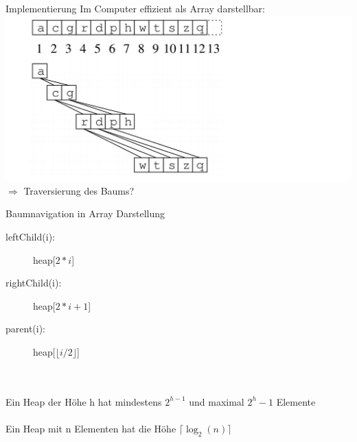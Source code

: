 \begin{frame}{Implementierung}
	Im Computer effizient als Array darstellbar: \\
	\includegraphics[scale=0.2]{images/heapArray.png} \\
	$\Rightarrow$ Traversierung des Baums?
\end{frame}

\begin{frame}{Baumnavigation in Array Darstellung}
	\begin{description}
		\item[leftChild(i):] heap[$2*i$]
		\item[rightChild(i):] heap[$2*i + 1$]
		\item[parent(i):] heap[$\lfloor i / 2 \rfloor$]
	\end{description}
	\ \\
	\ \\
	Ein Heap der Höhe h hat mindestens $2^{h - 1} $ und maximal $ 2^{h} - 1$ Elemente \\
	\ \\
	Ein Heap mit n Elementen hat die Höhe $\lceil \log_2(n) \rceil$
\end{frame}




